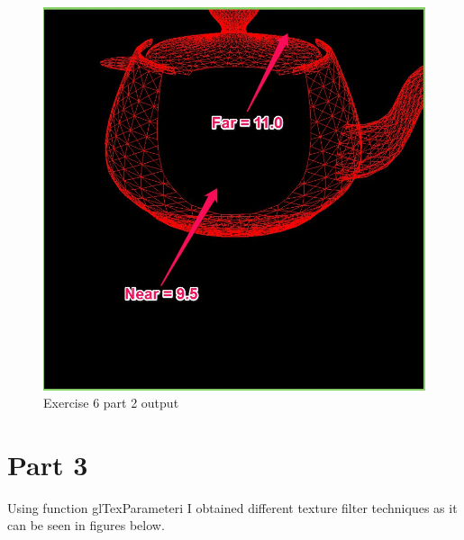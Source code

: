 \begin{figure}[ht!]
	\begin{center}
		\includegraphics[width=1.0\textwidth]{figures/exercise_6_part_3}
	\end{center}
	\vspace{-4.5ex}\caption{Exercise 6 part 2 output}
	\label{fig:exercise_6_part_3} 
\end{figure}
\clearpage

\section{Part 3}
Using function glTexParameteri I obtained different texture filter techniques as it can
be seen in figures below.

